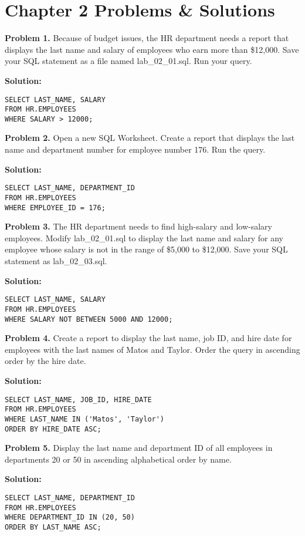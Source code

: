 \documentclass[12pt,a4paper]{article}
\begin{document}
\section{Chapter 2 Problems \& Solutions}

\textbf{Problem 1.} Because of budget issues, the HR department needs a report that displays the last name and salary of employees who earn more than \$12,000. Save your SQL statement as a file named lab\_02\_01.sql. Run your query.

\textbf{Solution:}
\begin{lstlisting}[style=sqlstyle]
SELECT LAST_NAME, SALARY
FROM HR.EMPLOYEES
WHERE SALARY > 12000;
\end{lstlisting}

\textbf{Problem 2.} Open a new SQL Worksheet. Create a report that displays the last name and department number for employee number 176. Run the query.

\textbf{Solution:}
\begin{lstlisting}[style=sqlstyle]
SELECT LAST_NAME, DEPARTMENT_ID
FROM HR.EMPLOYEES
WHERE EMPLOYEE_ID = 176;
\end{lstlisting}

\textbf{Problem 3.} The HR department needs to find high-salary and low-salary employees. Modify lab\_02\_01.sql to display the last name and salary for any employee whose salary is not in the range of \$5,000 to \$12,000. Save your SQL statement as lab\_02\_03.sql.

\textbf{Solution:}
\begin{lstlisting}[style=sqlstyle]
SELECT LAST_NAME, SALARY
FROM HR.EMPLOYEES
WHERE SALARY NOT BETWEEN 5000 AND 12000;
\end{lstlisting}

\textbf{Problem 4.} Create a report to display the last name, job ID, and hire date for employees with the last names of Matos and Taylor. Order the query in ascending order by the hire date.

\textbf{Solution:}
\begin{lstlisting}[style=sqlstyle]
SELECT LAST_NAME, JOB_ID, HIRE_DATE
FROM HR.EMPLOYEES
WHERE LAST_NAME IN ('Matos', 'Taylor')
ORDER BY HIRE_DATE ASC;
\end{lstlisting}

\textbf{Problem 5.} Display the last name and department ID of all employees in departments 20 or 50 in ascending alphabetical order by name.

\textbf{Solution:}
\begin{lstlisting}[style=sqlstyle]
SELECT LAST_NAME, DEPARTMENT_ID
FROM HR.EMPLOYEES
WHERE DEPARTMENT_ID IN (20, 50)
ORDER BY LAST_NAME ASC;
\end{lstlisting}
\end{document}
